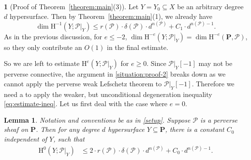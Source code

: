 \documentclass[english]{smfart}
\renewcommand{\mathbb}{\mathbf}
\renewcommand{\leq}{\leqslant}
\renewcommand{\geq}{\geqslant}
\renewcommand{\subset}{\subseteq}
\theoremstyle{remark}
\theoremstyle{plain}
\newtheorem{lemma}[remark]{Lemma}
\theoremstyle{definition}
\numberwithin{equation}{remark}
\theoremstyle{void}
\newtheorem{situation}[remark]{}
\begin{document}
\begin{situation}[Proof of Theorem~\ref{theorem:main}(3)]
\label{situation:proof-3}
Let \(Y = Y_0 \subset X\) be an arbitrary degree \(d\) hypersurface.
Then by Theorem~\ref{theorem:main}(1), we already have
\[
\dim \mathrm{H}^{-1}(Y;\mathcal{P}|_Y) \leq
r(\mathcal{P}) \cdot \delta(\mathcal{P}) \cdot d^{n(\mathcal{P})} + C_1 \cdot d^{n(\mathcal{P})-1}.
\]
As in the previous discussion, for \(e \leq -2\),
\(\dim \mathrm{H}^{-e}(Y;\mathcal{P}|_Y) = \dim \mathrm{H}^{-e}(\mathbb{P},\mathcal{P})\),
so they only contribute an \(O(1)\) in the final estimate.

So we are left to estimate \(\mathrm{H}^e(Y;\mathcal{P}|_{Y})\) for
\(e\geq 0\).  Since \(\mathcal{P}|_Y[-1]\) may not be perverse
connective, the argument in \ref{situation:proof-2} breaks down as we
cannot apply the perverse weak Lefschetz theorem to
\(\mathcal{P}|_Y[-1]\).  Therefore we need a to apply the weaker, but
unconditional degeneration inequality \eqref{eq:estimate-ineq}.
Let us first deal with the case where \(e = 0\).
\end{situation}

\begin{lemma}\label{lemma:bad-factor}
Notation and conventions be as in \ref{setup}.  Suppose
\(\mathcal{P}\) is a perverse sheaf on \(\mathbb{P}\).  Then for any
degree \(d\) hypersurface \(Y\subset \mathbb{P}\), there is a constant
\(C_0\) independent of \(Y\), such that
\begin{align*}
  \mathrm{H}^0(Y;\mathcal{P}|_Y)
  &\leq 2 \cdot r(\mathcal{P}) \cdot \delta(\mathcal{P}) \cdot d^{n(\mathcal{P})}
    + C_0 \cdot d^{n(\mathcal{P}) -1}.
\end{align*}
\end{lemma}
\end{document}
